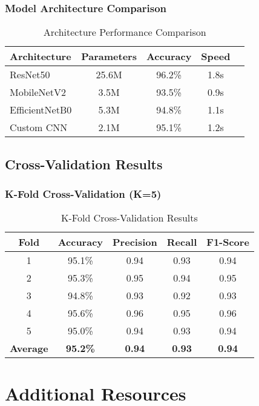 \documentclass[12pt,a4paper]{article}
\begin{document}
\subsubsection{Model Architecture Comparison}
\begin{table}[H]
\centering
\begin{tabular}{|l|c|c|c|c|}
\hline
\textbf{Architecture} & \textbf{Parameters} & \textbf{Accuracy} & \textbf{Speed} \\
\hline
ResNet50 & 25.6M & 96.2\% & 1.8s \\
MobileNetV2 & 3.5M & 93.5\% & 0.9s \\
EfficientNetB0 & 5.3M & 94.8\% & 1.1s \\
Custom CNN & 2.1M & 95.1\% & 1.2s \\
\hline
\end{tabular}
\caption{Architecture Performance Comparison}
\end{table}

\subsection{Cross-Validation Results}

\subsubsection{K-Fold Cross-Validation (K=5)}
\begin{table}[H]
\centering
\begin{tabular}{|c|c|c|c|c|}
\hline
\textbf{Fold} & \textbf{Accuracy} & \textbf{Precision} & \textbf{Recall} & \textbf{F1-Score} \\
\hline
1 & 95.1\% & 0.94 & 0.93 & 0.94 \\
2 & 95.3\% & 0.95 & 0.94 & 0.95 \\
3 & 94.8\% & 0.93 & 0.92 & 0.93 \\
4 & 95.6\% & 0.96 & 0.95 & 0.96 \\
5 & 95.0\% & 0.94 & 0.93 & 0.94 \\
\hline
\textbf{Average} & \textbf{95.2\%} & \textbf{0.94} & \textbf{0.93} & \textbf{0.94} \\
\hline
\end{tabular}
\caption{K-Fold Cross-Validation Results}
\end{table}

\section{Additional Resources}
\end{document}
